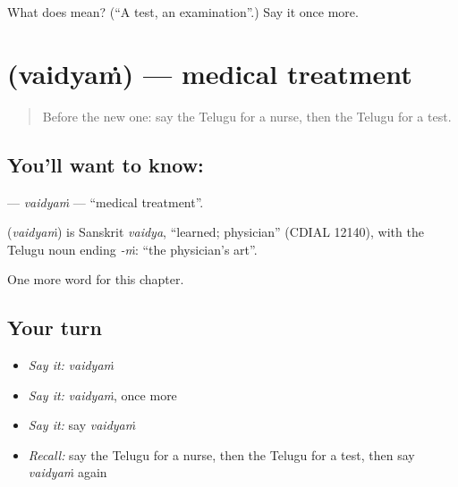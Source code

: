 \begin{tcolorbox}[breakable,colback=teal!4,colframe=teal!35!black,title={Before you move on}]
What does  mean? (\textquotedblleft{}A test, an examination\textquotedblright{}.) Say it once more.
\end{tcolorbox}
\section[\texorpdfstring{\te{వైద్యం} (vaidyaṁ)}{వైద్యం (vaidyaṁ)}]{ (vaidyaṁ) — medical treatment}

\label{lesson:TE-C209-vaidyam}



\begin{quote}
Before the new one: say the Telugu for a nurse, then the Telugu for a test.
\end{quote}

\subsection*{You'll want to know: }
\textbf{} — \emph{vaidyaṁ} — \textquotedblleft{}medical treatment\textquotedblright{}.

\begin{cousinweb}
\textbf{} (\emph{vaidyaṁ}) is Sanskrit \emph{vaidya}, \textquotedblleft{}learned; physician\textquotedblright{} (CDIAL 12140), with the Telugu noun ending \emph{-ṁ}: \textquotedblleft{}the physician's art\textquotedblright{}.
\end{cousinweb}

\begin{grammarlens}[title={What you've built}]
One more word for this chapter.
\end{grammarlens}

\subsection*{Your turn}
\begin{itemize}
\raggedright
  \item \emph{Say it:} \emph{vaidyaṁ}
  \item \emph{Say it:} \emph{vaidyaṁ}, once more
  \item \emph{Say it:} say \emph{vaidyaṁ}
  \item \emph{Recall:} say the Telugu for a nurse, then the Telugu for a test, then say \emph{vaidyaṁ} again
\end{itemize}

